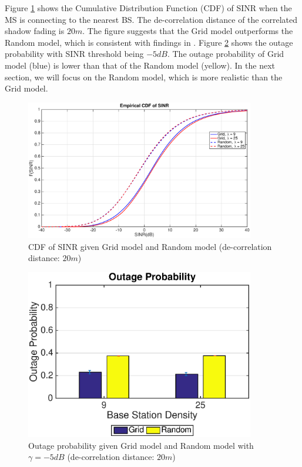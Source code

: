  \par Figure \ref{4:cdf1} shows the Cumulative Distribution Function (CDF) of SINR when the MS is connecting to the nearest BS. The de-correlation distance of the correlated shadow fading is $20m$. The figure suggests that the Grid model outperforms the Random model, which is consistent with findings in \cite{andrews2011tractable}. Figure \ref{4:outage1} shows the outage probability with SINR threshold being $-5dB$. The outage probability of Grid model (blue) is lower than that of the Random model (yellow). In the next section, we will focus on the Random model, which is more realistic than the Grid model.
 \begin{figure}
 \centering
 \includegraphics[width=10cm]{GridVSRandom.eps}
 \caption{CDF of SINR given Grid model and Random model (de-correlation distance: $20m$)}
 \label{4:cdf1}
 \end{figure}
 \begin{figure}
 \centering
 \includegraphics[width=10cm]{OutageProbGridVSRandom.eps}
 \caption{Outage probability given Grid model and Random model with $\gamma = -5dB$ (de-correlation distance: $20m$)}
 \label{4:outage1}
 \end{figure}


